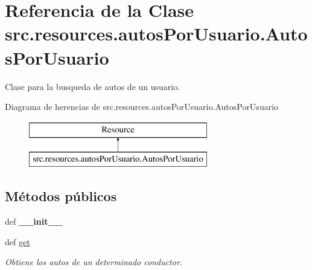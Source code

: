 \hypertarget{classsrc_1_1resources_1_1autos_por_usuario_1_1_autos_por_usuario}{\section{Referencia de la Clase src.\-resources.\-autos\-Por\-Usuario.\-Autos\-Por\-Usuario}
\label{classsrc_1_1resources_1_1autos_por_usuario_1_1_autos_por_usuario}
}


Clase para la busqueda de autos de un usuario.  


Diagrama de herencias de src.\-resources.\-autos\-Por\-Usuario.\-Autos\-Por\-Usuario\begin{figure}[H]
\begin{center}
\leavevmode
\includegraphics[height=2.000000cm]{classsrc_1_1resources_1_1autos_por_usuario_1_1_autos_por_usuario}
\end{center}
\end{figure}
\subsection*{Métodos públicos}
\begin{DoxyCompactItemize}
\item 
\hypertarget{classsrc_1_1resources_1_1autos_por_usuario_1_1_autos_por_usuario_a4ef31d25c8eaa7ec535645d7d62b85c5}{def {\bfseries \-\_\-\-\_\-init\-\_\-\-\_\-}}\label{classsrc_1_1resources_1_1autos_por_usuario_1_1_autos_por_usuario_a4ef31d25c8eaa7ec535645d7d62b85c5}

\item 
def \hyperlink{classsrc_1_1resources_1_1autos_por_usuario_1_1_autos_por_usuario_a2114ca03b2dc41a64af704b59609e791}{get}
\begin{DoxyCompactList}\small\item\em Obtiene los autos de un determinado conductor. \end{DoxyCompactList}\end{DoxyCompactItemize}
